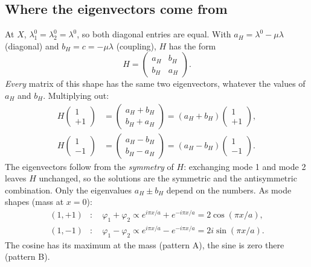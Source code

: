 \subsection{Where the eigenvectors come from}
At $X$, $\lambda_1^0 = \lambda_2^0 = \lambda^0$, so both diagonal entries are
equal. With $a_H = \lambda^0 - \mu\lambda$ (diagonal) and $b_H = c = -\mu\lambda$
(coupling), $H$ has the form
\begin{equation}
  H = \begin{pmatrix} a_H & b_H \\ b_H & a_H \end{pmatrix} .
\end{equation}
\emph{Every} matrix of this shape has the same two eigenvectors, whatever the
values of $a_H$ and $b_H$. Multiplying out:
\begin{align}
  H \begin{pmatrix} 1 \\ +1 \end{pmatrix} &= \begin{pmatrix} a_H + b_H \\ b_H + a_H \end{pmatrix} = (a_H + b_H) \begin{pmatrix} 1 \\ +1 \end{pmatrix}, \\
  H \begin{pmatrix} 1 \\ -1 \end{pmatrix} &= \begin{pmatrix} a_H - b_H \\ b_H - a_H \end{pmatrix} = (a_H - b_H) \begin{pmatrix} 1 \\ -1 \end{pmatrix} .
\end{align}
The eigenvectors follow from the \emph{symmetry} of $H$: exchanging mode 1 and
mode 2 leaves $H$ unchanged, so the solutions are the symmetric and the
antisymmetric combination. Only the eigenvalues $a_H \pm b_H$ depend on the
numbers. As mode shapes (mass at $x = 0$):
\begin{align}
  (1, +1) &: \quad \varphi_1 + \varphi_2 \propto e^{i\pi x/a} + e^{-i\pi x/a} = 2\cos(\pi x/a), \\
  (1, -1) &: \quad \varphi_1 - \varphi_2 \propto e^{i\pi x/a} - e^{-i\pi x/a} = 2i\sin(\pi x/a).
\end{align}
The cosine has its maximum at the mass (pattern A), the sine is zero there
(pattern B).

